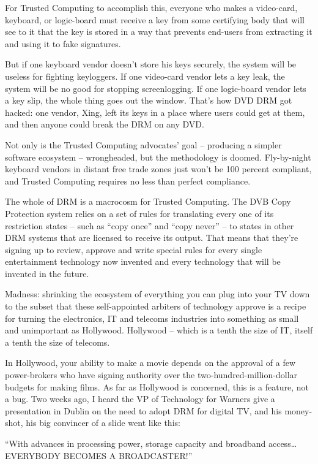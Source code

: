 For Trusted Computing to accomplish this, everyone who makes a
video-card, keyboard, or logic-board must receive a key from some
certifying body that will see to it that the key is stored in a way
that prevents end-users from extracting it and using it to fake
signatures.

But if one keyboard vendor doesn't store his keys securely, the
system will be useless for fighting keyloggers. If one video-card
vendor lets a key leak, the system will be no good for stopping
screenlogging. If one logic-board vendor lets a key slip, the whole
thing goes out the window. That's how DVD DRM got hacked: one
vendor, Xing, left its keys in a place where users could get at
them, and then anyone could break the DRM on any DVD.

Not only is the Trusted Computing advocates' goal -- producing a
simpler software ecosystem -- wrongheaded, but the methodology is
doomed. Fly-by-night keyboard vendors in distant free trade zones
just won't be 100 percent compliant, and Trusted Computing requires
no less than perfect compliance.

The whole of DRM is a macrocosm for Trusted Computing. The DVB Copy
Protection system relies on a set of rules for translating every
one of its restriction states -- such as ``copy once'' and ``copy
never'' -- to states in other DRM systems that are licensed to
receive its output. That means that they're signing up to review,
approve and write special rules for every single entertainment
technology now invented and every technology that will be invented
in the future.

Madness: shrinking the ecosystem of everything you can plug into
your TV down to the subset that these self-appointed arbiters of
technology approve is a recipe for turning the electronics, IT and
telecoms industries into something as small and unimportant as
Hollywood. Hollywood -- which is a tenth the size of IT, itself a
tenth the size of telecoms.

In Hollywood, your ability to make a movie depends on the approval
of a few power-brokers who have signing authority over the
two-hundred-million-dollar budgets for making films. As far as
Hollywood is concerned, this is a feature, not a bug. Two weeks
ago, I heard the VP of Technology for Warners give a presentation
in Dublin on the need to adopt DRM for digital TV, and his
money-shot, his big convincer of a slide went like this:

``With advances in processing power, storage capacity and broadband
access\ldots{} EVERYBODY BECOMES A BROADCASTER!''

